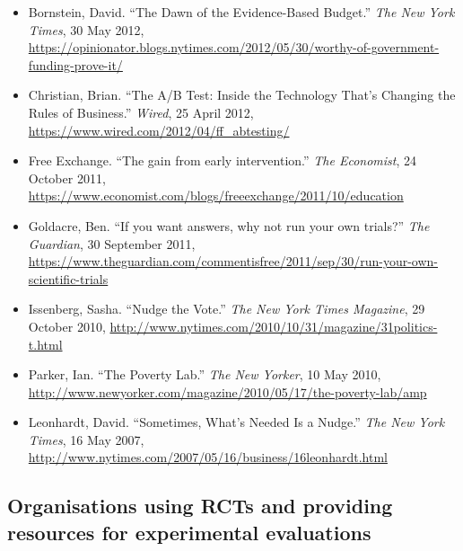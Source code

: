 \documentclass[12pt,a4paper]{article}
\begin{document}
\begin{itemize}
\item Bornstein, David. ``The Dawn of the Evidence-Based Budget.'' \textit{The New York Times}, 30 May 2012, \url{https://opinionator.blogs.nytimes.com/2012/05/30/worthy-of-government-funding-prove-it/}

\item Christian, Brian. ``The A/B Test: Inside the Technology That's Changing the Rules of Business.'' \textit{Wired}, 25 April 2012, \url{https://www.wired.com/2012/04/ff_abtesting/}

\item Free Exchange. ``The gain from early intervention.'' \textit{The Economist}, 24 October 2011, \url{https://www.economist.com/blogs/freeexchange/2011/10/education}

\item Goldacre, Ben. ``If you want answers, why not run your own trials?'' \textit{The Guardian}, 30 September 2011, \url{https://www.theguardian.com/commentisfree/2011/sep/30/run-your-own-scientific-trials}

\item Issenberg, Sasha. ``Nudge the Vote.'' \textit{The New York Times Magazine}, 29 October 2010, \url{http://www.nytimes.com/2010/10/31/magazine/31politics-t.html}

\item Parker, Ian. ``The Poverty Lab.'' \textit{The New Yorker}, 10 May 2010, \url{http://www.newyorker.com/magazine/2010/05/17/the-poverty-lab/amp}

\item Leonhardt, David. ``Sometimes, What's Needed Is a Nudge.'' \textit{The New York Times}, 16 May 2007, \url{http://www.nytimes.com/2007/05/16/business/16leonhardt.html}

\end{itemize}


\subsection*{Organisations using RCTs and providing resources for experimental evaluations}
\end{document}
